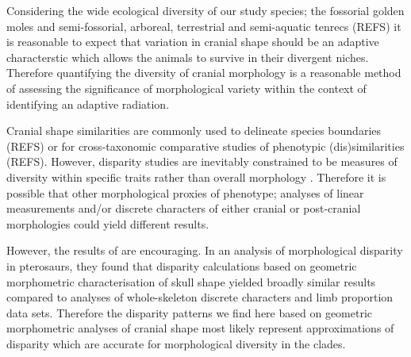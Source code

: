 \documentclass[12pt,a4paper]{article}
\begin{document}

Considering the wide ecological diversity of our study species; the fossorial golden moles and semi-fossorial, arboreal, terrestrial and semi-aquatic tenrecs (REFS) it is reasonable to expect that variation in cranial shape should be an adaptive characterstic which allows the animals to survive in their divergent niches. Therefore quantifying the diversity of cranial morphology is a reasonable method of assessing the significance of morphological variety within the context of identifying an adaptive radiation.

Cranial shape similarities are commonly used to delineate species boundaries (REFS) or for cross-taxonomic comparative studies of phenotypic (dis)similarities (REFS). However, disparity studies are inevitably constrained to be measures of diversity within specific traits rather than overall morphology \citep{Roy1997}. Therefore it is possible that other morphological proxies of phenotype; analyses of linear measurements and/or discrete characters of either cranial or post-cranial morphologies could yield different results. 

However, the results of \citep{Foth2012} are encouraging. In an analysis of morphological disparity in pterosaurs, they found that disparity calculations based on geometric morphometric characterisation of skull shape yielded broadly similar results compared to analyses of whole-skeleton discrete characters and limb proportion data sets. Therefore the disparity patterns we find here based on geometric morphometric analyses of cranial shape most likely represent approximations of disparity which are accurate for morphological diversity in the clades. 


\end{document}
